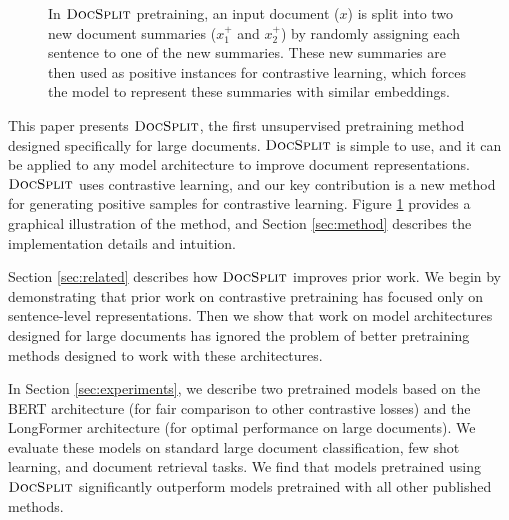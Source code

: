 \documentclass[11pt]{article}
\newcommand{\our}{\mbox{\textsc{DocSplit}}}
\begin{document}
\begin{figure}
    \centering
    
\caption{
    In $\our$ pretraining,
    an input document ($x$) is split into two new document summaries ($x_1^+$ and $x_2^+$) by randomly assigning each sentence to one of the new summaries.
    These new summaries are then used as positive instances for contrastive learning,
    which forces the model to represent these summaries with similar embeddings.
}
\label{overall}
\end{figure}

This paper presents $\our$, the first unsupervised pretraining method designed specifically for large documents.
$\our$ is simple to use,
and it can be applied to any model architecture to improve document representations. 
$\our$ uses contrastive learning,
and our key contribution is a new method for generating positive samples for contrastive learning.
Figure \ref{overall} provides a graphical illustration of the method,
and Section \ref{sec:method} describes the implementation details and intuition.

Section \ref{sec:related} describes how $\our$ improves prior work.
We begin by demonstrating that prior work on contrastive pretraining has focused only on sentence-level representations.
Then we show that work on model architectures designed for large documents has ignored the problem of better pretraining methods designed to work with these architectures.


In Section \ref{sec:experiments}, we describe two pretrained models based on the BERT architecture (for fair comparison to other contrastive losses) and the LongFormer architecture (for optimal performance on large documents).
We evaluate these models on standard large document classification, few shot learning, and document retrieval tasks.
We find that models pretrained using $\our$ significantly outperform models pretrained with all other published methods.
\end{document}
